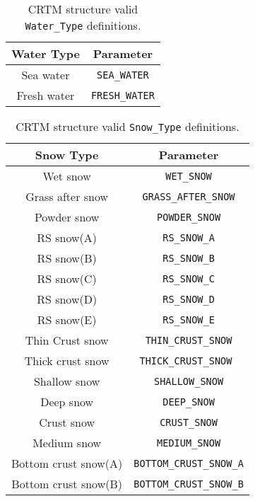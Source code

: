 \begin{table}[htp]
  \centering
  \begin{tabular}{|c|c|}
    \hline
    \sffamily\textbf{Water Type} & \sffamily\textbf{Parameter} \\
    \hline\hline
      Sea water  &  \texttt{SEA\_WATER} \\     
     Fresh water &  \texttt{FRESH\_WATER} \\   
    \hline
  \end{tabular}
  \caption{CRTM \Surface{} structure valid \texttt{Water\_Type} definitions.}
  \label{tab:surface_water_type}
\end{table}

\begin{table}[htp]
  \centering
  \begin{tabular}{|c|c|}
    \hline
    \sffamily\textbf{Snow Type} & \sffamily\textbf{Parameter} \\
    \hline\hline
         Wet snow          &   \texttt{WET\_SNOW} \\           
      Grass after snow     &   \texttt{GRASS\_AFTER\_SNOW} \\   
        Powder snow        &   \texttt{POWDER\_SNOW} \\        
         RS snow(A)        &   \texttt{RS\_SNOW\_A} \\          
         RS snow(B)        &   \texttt{RS\_SNOW\_B} \\          
         RS snow(C)        &   \texttt{RS\_SNOW\_C} \\          
         RS snow(D)        &   \texttt{RS\_SNOW\_D} \\          
         RS snow(E)        &   \texttt{RS\_SNOW\_E} \\          
      Thin Crust snow      &   \texttt{THIN\_CRUST\_SNOW} \\    
      Thick crust snow     &   \texttt{THICK\_CRUST\_SNOW } \\  
        Shallow snow       &   \texttt{SHALLOW\_SNOW} \\       
         Deep snow         &   \texttt{DEEP\_SNOW} \\          
        Crust snow         &   \texttt{CRUST\_SNOW} \\         
        Medium snow        &   \texttt{MEDIUM\_SNOW} \\        
     Bottom crust snow(A)  &   \texttt{BOTTOM\_CRUST\_SNOW\_A} \\
     Bottom crust snow(B)  &   \texttt{BOTTOM\_CRUST\_SNOW\_B} \\
    \hline
  \end{tabular}
  \caption{CRTM \Surface{} structure valid \texttt{Snow\_Type} definitions.}
  \label{tab:surface_snow_type}
\end{table}

